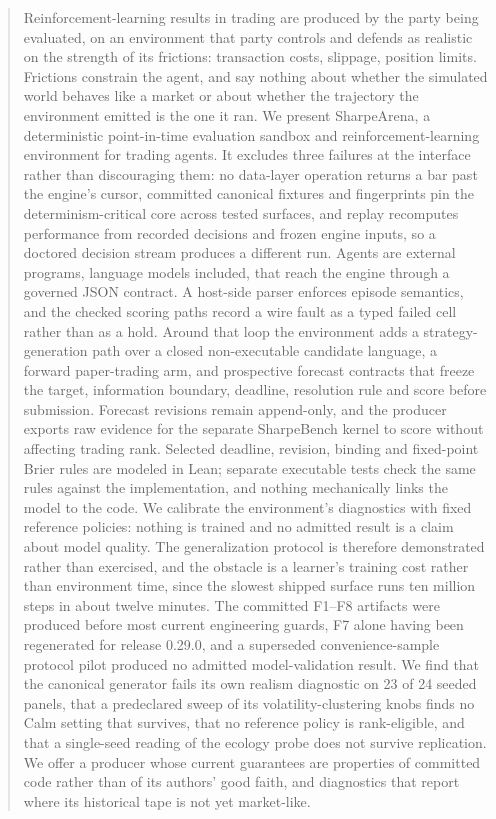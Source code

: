 \begin{abstract}
Reinforcement-learning results in trading are produced by the party being evaluated, on an environment that party controls and defends as realistic on the strength of its frictions: transaction costs, slippage, position limits. Frictions constrain the agent, and say nothing about whether the simulated world behaves like a market or about whether the trajectory the environment emitted is the one it ran. We present SharpeArena, a deterministic point-in-time evaluation sandbox and reinforcement-learning environment for trading agents. It excludes three failures at the interface rather than discouraging them: no data-layer operation returns a bar past the engine's cursor, committed canonical fixtures and fingerprints pin the determinism-critical core across tested surfaces, and replay recomputes performance from recorded decisions and frozen engine inputs, so a doctored decision stream produces a different run. Agents are external programs, language models included, that reach the engine through a governed JSON contract. A host-side parser enforces episode semantics, and the checked scoring paths record a wire fault as a typed failed cell rather than as a hold. Around that loop the environment adds a strategy-generation path over a closed non-executable candidate language, a forward paper-trading arm, and prospective forecast contracts that freeze the target, information boundary, deadline, resolution rule and score before submission. Forecast revisions remain append-only, and the producer exports raw evidence for the separate SharpeBench kernel to score without affecting trading rank. Selected deadline, revision, binding and fixed-point Brier rules are modeled in Lean; separate executable tests check the same rules against the implementation, and nothing mechanically links the model to the code. We calibrate the environment's diagnostics with fixed reference policies: nothing is trained and no admitted result is a claim about model quality. The generalization protocol is therefore demonstrated rather than exercised, and the obstacle is a learner's training cost rather than environment time, since the slowest shipped surface runs ten million steps in about twelve minutes. The committed F1--F8 artifacts were produced before most current engineering guards, F7 alone having been regenerated for release 0.29.0, and a superseded convenience-sample protocol pilot produced no admitted model-validation result. We find that the canonical generator fails its own realism diagnostic on 23 of 24 seeded panels, that a predeclared sweep of its volatility-clustering knobs finds no Calm setting that survives, that no reference policy is rank-eligible, and that a single-seed reading of the ecology probe does not survive replication. We offer a producer whose current guarantees are properties of committed code rather than of its authors' good faith, and diagnostics that report where its historical tape is not yet market-like.
\end{abstract}
